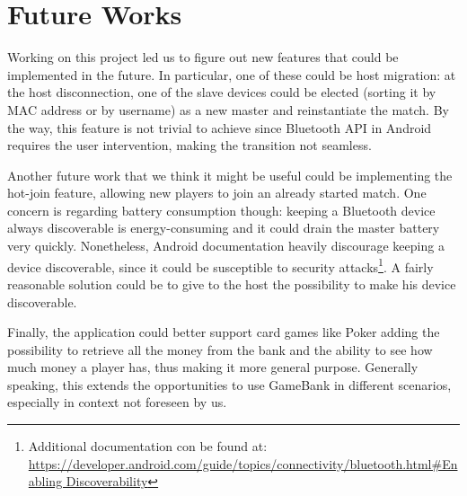 \section{Future Works}

Working on this project led us to figure out new features that could be 
implemented in the future. In particular, one of these could be host migration: 
at the host disconnection, one of the slave devices could be elected (sorting it 
by MAC address or by username) as a new master and reinstantiate the match. 
By the way, this feature is not trivial to achieve since Bluetooth API in 
Android requires the user intervention, making the transition not seamless.

Another future work that we think it might be useful could be implementing 
the hot-join feature, allowing new players to join an already started match. 
One concern is regarding battery consumption though: keeping a Bluetooth device 
always discoverable is energy-consuming and it could drain the master battery 
very quickly. Nonetheless, Android documentation heavily discourage keeping a 
device discoverable, since it could be susceptible to security 
attacks\footnote{Additional documentation con be found at: \url{ 
https://developer.android.com/guide/topics/connectivity/bluetooth.html\#Enabling
Discoverability}}.
A fairly reasonable solution could be to give to the host the possibility to 
make his device discoverable.

Finally, the application could better support card games like Poker adding the 
possibility to retrieve all the money from the bank and the ability to see 
how much money a player has, thus making it more general purpose. Generally 
speaking, this extends the opportunities to use GameBank in different scenarios, 
especially in context not foreseen by us.